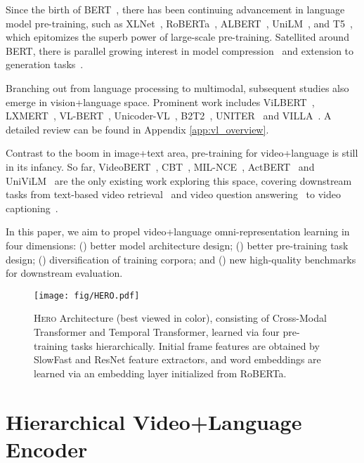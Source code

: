 \documentclass[11pt,a4paper]{article}
\begin{document}
\label{sec:related}

Since the birth of BERT~\cite{devlin2018bert}, there has been continuing advancement in language model pre-training, such as XLNet~\cite{yang2019xlnet}, RoBERTa~\cite{liu2019roberta}, ALBERT~\cite{lan2019albert},
UniLM~\cite{dong2019unified}, and T5~\cite{raffel2019exploring}, which epitomizes the superb power of large-scale pre-training. Satellited around BERT, there is parallel growing interest in model compression~\cite{sun2019patient, shen2019q} and extension to generation tasks~\cite{chen2019distilling, wang2019bert}.

Branching out from language processing to multimodal, subsequent studies also emerge in vision+language space. 
Prominent work includes ViLBERT~\cite{lu2019vilbert}, LXMERT~\cite{tan2019lxmert},
VL-BERT~\cite{su2019vl}, Unicoder-VL~\cite{li2019unicoder}, B2T2~\cite{alberti2019fusion}, UNITER~\cite{chen2019uniter} and VILLA~\cite{gan2020large}. A detailed review can be found in Appendix \ref{app:vl_overview}. 

Contrast to the boom in image+text area, pre-training for video+language is still in its infancy. So far, VideoBERT~\cite{sun2019videobert}, CBT~\cite{sun2019contrastive}, MIL-NCE~\cite{miech2020end}, ActBERT~\cite{zhu2020actbert} and UniViLM~\cite{luo2020univilm} are the only existing work exploring this space, covering downstream tasks from text-based video retrieval~\citep{zhou2018towards, xu2016msr-vtt} and video question answering~\citep{maharaj2017dataset,lei2019tvqaplus} to video captioning~\cite{zhou2018end}.

In this paper, we aim to propel video+language omni-representation learning in four dimensions: () better model architecture design; () better pre-training task design; () diversification of training corpora; and () new high-quality benchmarks for downstream evaluation.
 \begin{figure*}[!t]
\centering
  \texttt{[image: fig/HERO.pdf]}
 \caption{\textsc{Hero} Architecture (best viewed in color), consisting of Cross-Modal Transformer and Temporal Transformer, learned via
four pre-training tasks hierarchically. 
Initial frame features are obtained by SlowFast and ResNet feature extractors, and word embeddings are learned via an embedding layer initialized from RoBERTa.} 
  \label{fig:model}
\end{figure*} 

\section{Hierarchical Video+Language Encoder}
\label{sec:method}
\end{document}
